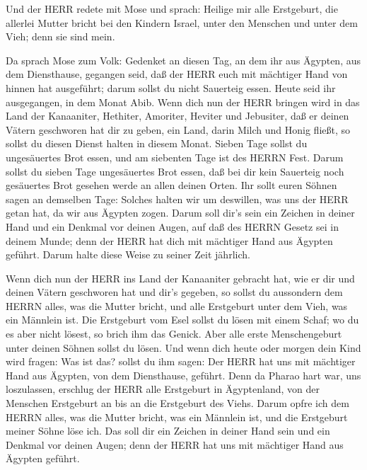  Und der HERR redete mit Mose und sprach: 
Heilige mir alle Erstgeburt, die allerlei Mutter bricht bei den Kindern
Israel, unter den Menschen und unter dem Vieh; denn sie sind mein.

 Da sprach Mose zum Volk: Gedenket an diesen Tag, an dem ihr
aus Ägypten, aus dem Diensthause, gegangen seid, daß der HERR euch mit
mächtiger Hand von hinnen hat ausgeführt; darum sollst du nicht
Sauerteig essen.  Heute seid ihr ausgegangen, in dem Monat
Abib.  Wenn dich nun der HERR bringen wird in das Land der
Kanaaniter, Hethiter, Amoriter, Heviter und Jebusiter, daß er deinen
Vätern geschworen hat dir zu geben, ein Land, darin Milch und Honig
fließt, so sollst du diesen Dienst halten in diesem Monat. 
Sieben Tage sollst du ungesäuertes Brot essen, und am siebenten Tage ist
des HERRN Fest.  Darum sollst du sieben Tage ungesäuertes
Brot essen, daß bei dir kein Sauerteig noch gesäuertes Brot gesehen
werde an allen deinen Orten.  Ihr sollt euren Söhnen sagen
an demselben Tage: Solches halten wir um deswillen, was uns der HERR
getan hat, da wir aus Ägypten zogen.  Darum soll dir's sein
ein Zeichen in deiner Hand und ein Denkmal vor deinen Augen, auf daß des
HERRN Gesetz sei in deinem Munde; denn der HERR hat dich mit mächtiger
Hand aus Ägypten geführt.  Darum halte diese Weise zu
seiner Zeit jährlich.

 Wenn dich nun der HERR ins Land der Kanaaniter gebracht
hat, wie er dir und deinen Vätern geschworen hat und dir's gegeben,
 so sollst du aussondern dem HERRN alles, was die Mutter
bricht, und alle Erstgeburt unter dem Vieh, was ein Männlein ist.
 Die Erstgeburt vom Esel sollst du lösen mit einem Schaf;
wo du es aber nicht lösest, so brich ihm das Genick. Aber alle erste
Menschengeburt unter deinen Söhnen sollst du lösen.  Und
wenn dich heute oder morgen dein Kind wird fragen: Was ist das? sollst
du ihm sagen: Der HERR hat uns mit mächtiger Hand aus Ägypten, von dem
Diensthause, geführt.  Denn da Pharao hart war, uns
loszulassen, erschlug der HERR alle Erstgeburt in Ägyptenland, von der
Menschen Erstgeburt an bis an die Erstgeburt des Viehs. Darum opfre ich
dem HERRN alles, was die Mutter bricht, was ein Männlein ist, und die
Erstgeburt meiner Söhne löse ich.  Das soll dir ein Zeichen
in deiner Hand sein und ein Denkmal vor deinen Augen; denn der HERR hat
uns mit mächtiger Hand aus Ägypten geführt.

